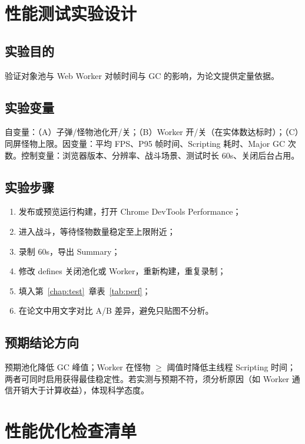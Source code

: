 ﻿
\section{性能测试实验设计}

\subsection{实验目的}

验证对象池与 Web Worker 对帧时间与 GC 的影响，为论文提供定量依据\cite{gregory2018game,mckenzie2008crowd,gregory2018game}。

\subsection{实验变量}

自变量：（A）子弹/怪物池化开/关；（B）Worker 开/关（在实体数达标时）；（C）同屏怪物上限。因变量：平均 FPS、P95 帧时间、Scripting 耗时、Major GC 次数。控制变量：浏览器版本、分辨率、战斗场景、测试时长 60s、关闭后台占用。

\subsection{实验步骤}

\begin{enumerate}[label=\arabic*.]
  \item 发布或预览运行构建，打开 Chrome DevTools Performance；
  \item 进入战斗，等待怪物数量稳定至上限附近；
  \item 录制 60s，导出 Summary；
  \item 修改 defines 关闭池化或 Worker，重新构建，重复录制；
  \item 填入第~\ref{chap:test}~章表~\ref{tab:perf}；
  \item 在论文中用文字对比 A/B 差异，避免只贴图不分析。
\end{enumerate}

\subsection{预期结论方向}

预期池化降低 GC 峰值；Worker 在怪物 $\geq$ 阈值时降低主线程 Scripting 时间；两者可同时启用获得最佳稳定性。若实测与预期不符，须分析原因（如 Worker 通信开销大于计算收益），体现科学态度。

\section{性能优化检查清单}

